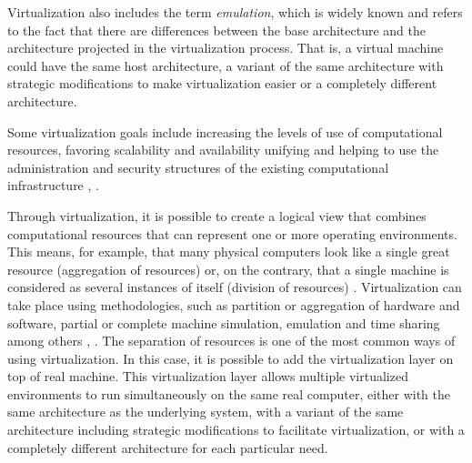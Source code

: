 	Virtualization also includes the term \textit{emulation}, which is widely known and refers to the fact that there are differences between the base architecture and the architecture projected in the virtualization process. That is, a virtual machine could have the same host architecture, a variant of the same architecture with strategic modifications to make virtualization easier or a completely different architecture.
	
	
	
	Some virtualization goals include increasing the levels of use of computational resources, favoring scalability and availability unifying and helping to use the administration and security structures of the existing computational infrastructure \cite{Kusnetzky2011}, \cite{Hui2014}.
	
	
	Through virtualization, it is possible to create a logical view that combines computational resources that can represent one or more operating environments. This means, for example, that many physical computers look like a single great resource (aggregation of resources) or, on the contrary, that a single machine is considered as several instances of itself (division of resources) \cite{Silberschatz2014}. Virtualization can take place using methodologies, such as partition or aggregation of hardware and software, partial or complete machine simulation, emulation and time sharing among others \cite{Chiueh2005}, \cite{Hoopes2009}. The separation of resources is one of the most common ways of using virtualization. In this case, it is possible to add the virtualization layer on top of real machine. This virtualization layer allows multiple virtualized environments to run simultaneously on the same real computer, either with the same architecture as the underlying system, with a variant of the same architecture including strategic modifications to facilitate virtualization, or with a completely different architecture for each particular need.
 

